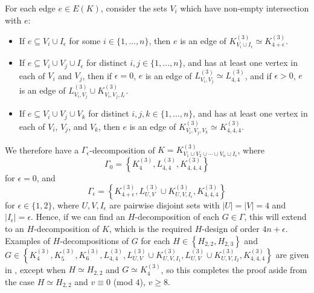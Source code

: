 For each edge $e \in E(K)$, consider the sets $V_i$ which have non-empty intersection with $e$:
\begin{itemize}
    \item If $e \subseteq V_i \cup I_\epsilon$ for some $i \in \{1,\ldots,n\}$, then $e$ is an edge of $K_{V_i \cup I_\epsilon}^{(3)} \simeq K_{4+\epsilon}^{(3)}$.
    \item If $e \subseteq V_i \cup V_j \cup I_\epsilon$ for distinct $i, j \in \{1,\ldots,n\}$, and has at least one vertex in each of $V_i$ and $V_j$,
        then if $\epsilon = 0$, $e$ is an edge of $L_{V_i,V_j}^{(3)} \simeq L_{4,4}^{(3)}$, and if $\epsilon > 0$, $e$ is an edge of
        $L_{V_i,V_j}^{(3)} \cup K_{V_i,V_j,I_\epsilon}^{(3)}$.
    \item If $e \subseteq V_i \cup V_j \cup V_k$ for distinct $i, j, k \in \{1,\ldots,n\}$, and has at least one vertex in each of $V_i$, $V_j$, and $V_k$,
    then $e$ is an edge of $K_{V_i,V_j,V_k}^{(3)} \simeq K_{4,4,4}^{(3)}$.
\end{itemize}
We therefore have a $\Gamma_\epsilon$-decomposition of $K = K_{V_1 \cup V_2 \cup \cdots \cup V_n \cup I_\epsilon}^{(3)}$, where
\[
    \Gamma_0 = \left\{ K_{4}^{(3)}, L_{4,4}^{(3)}, K_{4,4,4}^{(3)} \right\}
\]
for $\epsilon = 0$, and
\[
    \Gamma_\epsilon = \left\{ K_{4+\epsilon}^{(3)}, L_{U,V}^{(3)} \cup K_{U,V,I_\epsilon}^{(3)}, K_{4,4,4}^{(3)} \right\}
\]
for $\epsilon \in \{1,2\}$, where $U, V, I_\epsilon$ are pairwise disjoint sets with $|U| = |V| = 4$ and $|I_\epsilon| = \epsilon$.
Hence, if we can find an $H$-decomposition of each $G \in \Gamma$, this will extend to an $H$-decomposition of $K$,
which is the required $H$-design of order $4n+\epsilon$.
Examples of $H$-decompositions of $G$ for each $H \in \left\{ H_{2,2}, H_{2,3} \right\}$
and $G \in \left\{ K_{4}^{(3)}, K_{5}^{(3)}, K_{6}^{(3)}, L_{4,4}^{(3)}, L_{U,V}^{(3)} \cup K_{U,V,I_1}^{(3)}, L_{U,V}^{(3)} \cup K_{U,V,I_2}^{(3)}, K_{4,4,4}^{(3)} \right\}$
are given in \cite{bryant}, except when $H \simeq H_{2,2}$ and $G \simeq K_{4}^{(3)}$,
so this completes the proof aside from the case $H \simeq H_{2,2}$ and $v \equiv 0$ (mod $4$), $v \geq 8$.

